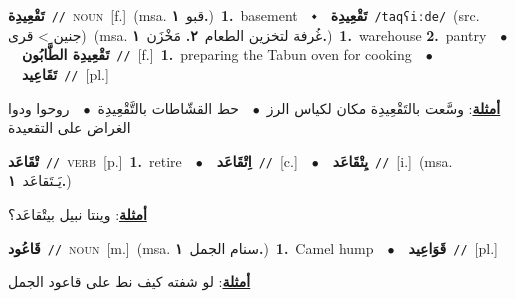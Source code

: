 \documentclass[10pt,a4paper,twoside]{article} %
\begin{document}
\begin{multicols}{2}
{\setlength\topsep{0pt}\textbf{\foreignlanguage{arabic}{تَقْعِيدِة}}\ {\color{gray}\texttt{//}\color{black}}\ \textsc{noun}\ [f.]\ \color{gray}(msa. \foreignlanguage{arabic}{قبو}~\foreignlanguage{arabic}{\textbf{١.}})\color{black}\ \textbf{1.}~basement\ \ $\smblkdiamond$\ \ \setlength\topsep{0pt}\textbf{\foreignlanguage{arabic}{تَقْعِيدِة}}\ {\color{gray}\texttt{/taqʕiːde/}\color{black}}\ (src. \color{gray}\foreignlanguage{arabic}{جنين > قرى}\color{black})\ \color{gray}(msa. \foreignlanguage{arabic}{غُرفة لتخزين الطعام}~\foreignlanguage{arabic}{\textbf{٢.}}  \foreignlanguage{arabic}{مَخْزَن}~\foreignlanguage{arabic}{\textbf{١.}})\color{black}\ \textbf{1.}~warehouse  \textbf{2.}~pantry\ \ $\bullet$\ \ \setlength\topsep{0pt}\textbf{\foreignlanguage{arabic}{تَقْعِيدِة الطَّابُون}}\ {\color{gray}\texttt{//}\color{black}}\ [f.]\ \textbf{1.}~preparing the Tabun oven for cooking\ \ $\bullet$\ \ \setlength\topsep{0pt}\textbf{\foreignlanguage{arabic}{تَقَاعِيد}}\ {\color{gray}\texttt{//}\color{black}}\ [pl.]\  \begin{flushright}\color{gray}\foreignlanguage{arabic}{\textbf{\underline{\foreignlanguage{arabic}{أمثلة}}}: وسَّعت بالتَقْعِيدِة مكان لكياس الرز\ $\bullet$\ \  حط القشّاطات بالتَّقْعِيدِة\ $\bullet$\ \  روحوا ودوا الغراض على التقعيدة}\end{flushright}\color{black}} \vspace{2mm}

{\setlength\topsep{0pt}\textbf{\foreignlanguage{arabic}{تْقَاعَد}}\ {\color{gray}\texttt{//}\color{black}}\ \textsc{verb}\ [p.]\ \textbf{1.}~retire\ \ $\bullet$\ \ \setlength\topsep{0pt}\textbf{\foreignlanguage{arabic}{اِتْقَاعَد}}\ {\color{gray}\texttt{//}\color{black}}\ [c.]\ \ $\bullet$\ \ \setlength\topsep{0pt}\textbf{\foreignlanguage{arabic}{يِتْقَاعَد}}\ {\color{gray}\texttt{//}\color{black}}\ [i.]\ \color{gray}(msa. \foreignlanguage{arabic}{يَـتَقاعَد}~\foreignlanguage{arabic}{\textbf{١.}})\color{black}\  \begin{flushright}\color{gray}\foreignlanguage{arabic}{\textbf{\underline{\foreignlanguage{arabic}{أمثلة}}}: وينتا نبيل بيتْقاعَد؟}\end{flushright}\color{black}} \vspace{2mm}

{\setlength\topsep{0pt}\textbf{\foreignlanguage{arabic}{قَاعُود}}\ {\color{gray}\texttt{//}\color{black}}\ \textsc{noun}\ [m.]\ \color{gray}(msa. \foreignlanguage{arabic}{سنام الجمل}~\foreignlanguage{arabic}{\textbf{١.}})\color{black}\ \textbf{1.}~Camel hump\ \ $\bullet$\ \ \setlength\topsep{0pt}\textbf{\foreignlanguage{arabic}{قَوَاعِيد}}\ {\color{gray}\texttt{//}\color{black}}\ [pl.]\  \begin{flushright}\color{gray}\foreignlanguage{arabic}{\textbf{\underline{\foreignlanguage{arabic}{أمثلة}}}: لو شفته كيف نط على قاعود الجمل}\end{flushright}\color{black}} \vspace{2mm}


\end{multicols}
\end{document}
